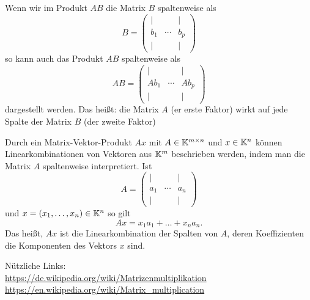 \begin{bem}
	Wenn wir im Produkt $A B$ die Matrix $B$ spaltenweise als 
	\[
		B = \begin{pmatrix} 
			| & & | 
			\\ b_1 & \cdots & b_p
			\\ | & & | 
		\end{pmatrix} 
	\]
	so kann auch das Produkt $AB$ spaltenweise als 
	\[
		AB =
		\begin{pmatrix} 
		| & & | 
		\\ A b_1 & \cdots & A b_p
		\\ | & & | 
		\end{pmatrix}
	\]
	dargestellt werden. Das heißt: die Matrix $A$ (er erste Faktor) wirkt auf jede Spalte der  Matrix $B$ (der zweite Faktor)
\end{bem}

\begin{bem}
	Durch ein Matrix-Vektor-Produkt $A x$ mit $A \in \mathbb K^{m \times n}$ und $x \in \mathbb K^n$ können Linearkombinationen von Vektoren aus $\mathbb K^m$ beschrieben werden, indem man die Matrix $A$ spaltenweise interpretiert. Ist 
	\[
		A = \begin{pmatrix} 
			| & & |
	\\		a_1 & \cdots & a_n 
	\\	| & & |
		\end{pmatrix} 
	\]
	und $x=(x_1,\ldots,x_n) \in \mathbb K^n$ so gilt 
	\[ 
		Ax = x_1a_1 + \ldots + x_na_n.
	\]
	Das heißt, $A x$ ist die Linearkombination der Spalten von $A$, deren Koeffizienten die Komponenten des Vektors $x$ sind. 
\end{bem}

\begin{bem}
	Nützliche Links: {\\ \scriptsize 
	 \url{https://de.wikipedia.org/wiki/Matrizenmultiplikation} \\ 
	 \url{https://en.wikipedia.org/wiki/Matrix_multiplication} } 
\end{bem} 

